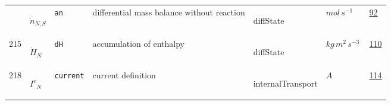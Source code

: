 \begin{longtable}{|p{1cm}|p{2.5cm}|p{4.5cm}|p{8cm}|p{3.0cm}|p{3cm}|p{1cm}|}
             & \hypertarget{"v:196"}{ $ {{\dot{n}}}{_{N, S}} $}
             & \verb|an|
             & differential mass balance without reaction
             & \begin{lay}diffState \end{lay}
             & $ mol \,s^{-1} \, $
             &                 \hyperlink{"e:92"}{ 92 }
                 \\
            215
             & \hypertarget{"v:215"}{ $ {{\dot{H}}}{_{N}} $}
             & \verb|dH|
             & accumulation of enthalpy
             & \begin{lay}diffState \end{lay}
             & $ kg \,m^{2} \,s^{-3} \, $
             &                 \hyperlink{"e:110"}{ 110 }
                 \\
            218
             & \hypertarget{"v:218"}{ $ {{I^e}}{_{N}} $}
             & \verb|current|
             & current definition
             & \begin{lay}internalTransport \end{lay}
             & $ A \, $
             &                 \hyperlink{"e:114"}{ 114 }
                 \\
    \end{longtable}